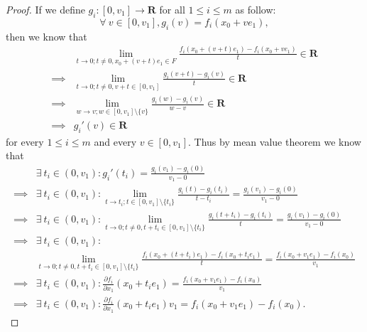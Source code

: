 \begin{proof}
    If we define \(g_i : [0, v_1] \to \mathbf{R}\) for all \(1 \leq i \leq m\) as follow:
    \[
        \forall\ v \in [0, v_1], g_i(v) = f_i(x_0 + v e_1),
    \]
    then we know that
    \begin{align*}
                 & \lim_{t \to 0 ; t \neq 0, x_0 + (v + t) e_1 \in F} \frac{f_i(x_0 + (v + t) e_1) - f_i(x_0 + v e_1)}{t} \in \mathbf{R} \\
        \implies & \lim_{t \to 0 ; t \neq 0, v + t \in [0, v_1]} \frac{g_i(v + t) - g_i(v)}{t} \in \mathbf{R}                            \\
        \implies & \lim_{w \to v ; w \in [0, v_1] \setminus \{v\}} \frac{g_i(w) - g_i(v)}{w - v} \in \mathbf{R}                          \\
        \implies & g_i'(v) \in \mathbf{R}
    \end{align*}
    for every \(1 \leq i \leq m\) and every \(v \in [0, v_1]\).
    Thus by mean value theorem we know that
    \begin{align*}
                 & \exists\ t_i \in (0, v_1) : g_i'(t_i) = \frac{g_i(v_1) - g_i(0)}{v_1 - 0}                                                                                            \\
        \implies & \exists\ t_i \in (0, v_1) : \lim_{t \to t_i; t \in [0, v_1] \setminus \{t_i\}} \frac{g_i(t) - g_i(t_i)}{t - t_i} = \frac{g_i(v_1) - g_i(0)}{v_1 - 0}                 \\
        \implies & \exists\ t_i \in (0, v_1) : \lim_{t \to 0; t \neq 0, t + t_i \in [0, v_1] \setminus \{t_i\}} \frac{g_i(t + t_i) - g_i(t_i)}{t} = \frac{g_i(v_1) - g_i(0)}{v_1 - 0}   \\
        \implies & \exists\ t_i \in (0, v_1) :                                                                                                                                          \\
                 & \lim_{t \to 0; t \neq 0, t + t_i \in [0, v_1] \setminus \{t_i\}} \frac{f_i(x_0 + (t + t_i) e_1) - f_i(x_0 + t_i e_1)}{t} = \frac{f_i(x_0 + v_1 e_1) - f_i(x_0)}{v_1} \\
        \implies & \exists\ t_i \in (0, v_1) : \frac{\partial f_i}{\partial x_1}(x_0 + t_i e_1) = \frac{f_i(x_0 + v_1 e_1) - f_i(x_0)}{v_1}                                             \\
        \implies & \exists\ t_i \in (0, v_1) : \frac{\partial f_i}{\partial x_1}(x_0 + t_i e_1) v_1 = f_i(x_0 + v_1 e_1) - f_i(x_0).
    \end{align*}

\end{proof}
